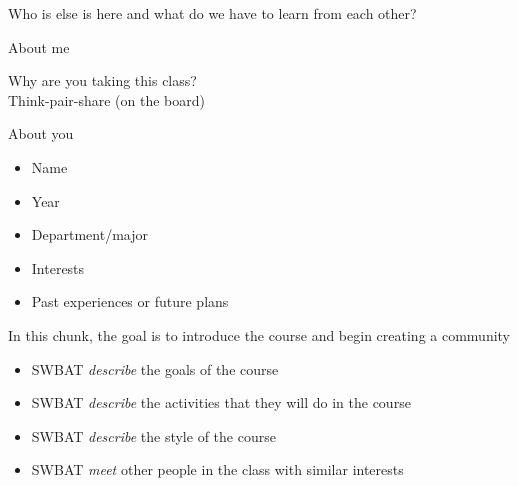 \documentclass{beamer}
\newcommand{\goals}{
\begin{itemize}
\item SWBAT \emph{describe} the goals of the course
\item SWBAT \emph{describe} the activities that they will do in the course
\item SWBAT \emph{describe} the style of the course
\item SWBAT \emph{meet} other people in the class with similar interests
\end{itemize}
}
\begin{document}
\begin{frame}

\begin{center}
\LARGE{Who is else is here and what do we have to learn from each other?}
\end{center}

\end{frame}
\begin{frame}

About me

\end{frame}
\begin{frame}

Why are you taking this class?\\
Think-pair-share (on the board)

\end{frame}
\begin{frame}

About you
\begin{itemize}
\item Name
\item Year
\item Department/major
\item Interests
\item Past experiences or future plans
\end{itemize}

\end{frame}
\begin{frame}

In this chunk, the goal is to introduce the course and begin creating a community

\goals

\end{frame}


\end{document}
